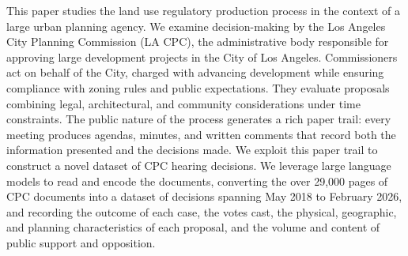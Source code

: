 This paper studies the land use regulatory production process in the context of a large urban planning agency. We examine decision-making by the Los Angeles City Planning Commission (LA CPC), the administrative body responsible for approving large development projects in the City of Los Angeles. Commissioners act on behalf of the City, charged with advancing development while ensuring compliance with zoning rules and public expectations. They evaluate proposals combining legal, architectural, and community considerations under time constraints. The public nature of the process generates a rich paper trail: every meeting produces agendas, minutes, and written comments that record both the information presented and the decisions made. 
We exploit this paper trail to construct a novel dataset of CPC hearing decisions. We leverage large language models to read and encode the documents, converting the over 29,000 pages of CPC documents into a dataset of  decisions spanning May 2018 to February 2026, and recording the outcome of each case, the votes cast, the physical, geographic, and planning characteristics of each proposal, and the volume and content of public support and opposition.




